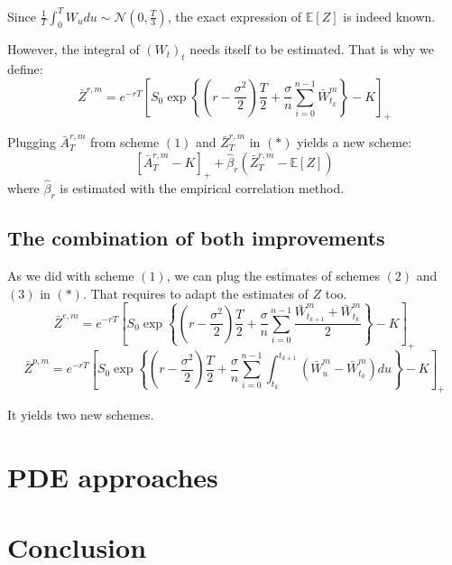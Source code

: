 \documentclass{article}
\begin{document}
Since $\frac{1}{T} \int_0^T W_u du \sim \mathcal N \left(0, \frac{T}{3} \right)$, the exact expression
of $\mathbb E[Z]$ is indeed known.

However, the integral of $(W_t)_t$ needs itself to be estimated. That is why we define:
\begin{equation}
	\bar Z^{r, m} = e^{-rT} \left[ S_0 \exp \left\{ \left( r - \frac{\sigma^2}{2} \right) \frac{T}{2} +
		\frac{\sigma}{n} \sum_{i=0}^{n-1} \bar W_{t_k}^m \right\} - K \right]_+
	\tag{$i$}
\end{equation}

Plugging $\bar A_T^{r, m}$ from scheme $(1)$ and $\bar Z_T^{r, m}$ in $(\ast)$ yields a new scheme:
\begin{equation}
	\left[ \bar A_T^{r, m} - K \right]_+ + \hat\beta_r \left( \bar Z_T^{r, m} - \mathbb E [Z] \right)
	\tag{4}
\end{equation}
where $\hat\beta_r$ is estimated with the empirical correlation method.

\subsection{The combination of both improvements}

As we did with scheme $(1)$, we can plug the estimates of schemes $(2)$ and $(3)$ in $(\ast)$. That requires
to adapt the estimates of $Z$ too.
\begin{equation}
	\bar Z^{e, m} = e^{-rT} \left[ S_0 \exp \left\{ \left( r - \frac{\sigma^2}{2} \right) \frac{T}{2} +
		\frac{\sigma}{n} \sum_{i=0}^{n-1} \frac{\bar W_{t_{k+1}}^m + \bar W_{t_k}^m}{2} \right\} - K \right]_+
	\tag{$ii$}
\end{equation}
\begin{equation}
	\bar Z^{p, m} = e^{-rT} \left[ S_0 \exp \left\{ \left( r - \frac{\sigma^2}{2} \right) \frac{T}{2} +
		\frac{\sigma}{n} \sum_{i=0}^{n-1}
		\int_{t_k}^{t_{k+1}} \left( \bar W_u^m - \bar W_{t_k}^m \right) du
		\right\} - K \right]_+
	\tag{$iii$}
\end{equation}

It yields two new schemes.

\section{PDE approaches}

\section*{Conclusion}


{}

\end{document}
